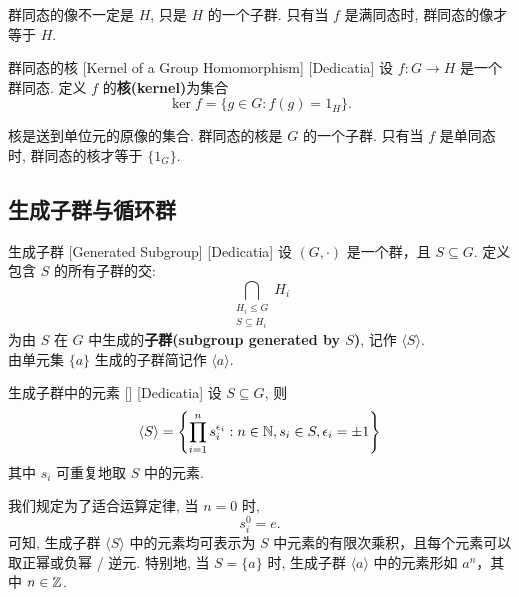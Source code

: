         \begin{rmk}
            群同态的像不一定是 \(H\), 只是 \(H\) 的一个子群. 只有当 \(f\) 是满同态时, 群同态的像才等于 \(H\).
        \end{rmk}

        \begin{dfn}
            {群同态的核}
            [Kernel of a Group Homomorphism]
            [Dedicatia]
            设 \(f:G\to H\) 是一个群同态. 定义 \(f\) 的\textbf{核(kernel)}为集合
            \[\ker f=\{g\in G: f(g)=1_H\}.\]
        \end{dfn}

        \begin{rmk}
            核是送到单位元的原像的集合. 群同态的核是 \(G\) 的一个子群. 只有当 \(f\) 是单同态时, 群同态的核才等于 \(\{1_G\}\).
        \end{rmk}

    \subsection{生成子群与循环群}

        \begin{dfn}
            {生成子群}
            [Generated Subgroup]
            [Dedicatia]
            设 \((G,\cdot)\) 是一个群，且 \(S\subseteq G\). 定义包含 \(S\) 的所有子群的交:
            \[\bigcap_{\substack{H_i\leq G\\S\subseteq H_i}} H_i\]
            为由 \(S\) 在 \(G\) 中生成的\textbf{子群(subgroup generated by \(S\))}, 记作 \(\langle S\rangle\).\\
            由单元集 \(\{a\}\) 生成的子群简记作 \(\langle a\rangle\).
        \end{dfn}

        \begin{ppt}
            {生成子群中的元素}
            []
            [Dedicatia]
            设 \(S\subseteq G\), 则 
            \[\langle S\rangle=\qty{\prod_{i=1}^{n} s_i^{\epsilon_i} : n\in\operatorname{\mathbb{N}}, s_i\in S, \epsilon_i=\pm 1}\]
            其中 \(s_i\) 可重复地取 \(S\) 中的元素.
        \end{ppt}

        \begin{rmk}
            [Dedicatia]
            我们规定为了适合运算定律, 当 \(n=0\) 时,
            \[s_i^0= e.\]
            可知, 生成子群 \(\langle S\rangle\) 中的元素均可表示为 \(S\) 中元素的有限次乘积，且每个元素可以取正幂或负幂 / 逆元. 特别地, 当 \(S=\{a\}\) 时, 生成子群 \(\langle a\rangle\) 中的元素形如 \(a^n\)，其中 \(n\in\operatorname{\mathbb{Z}}\).
        \end{rmk}


